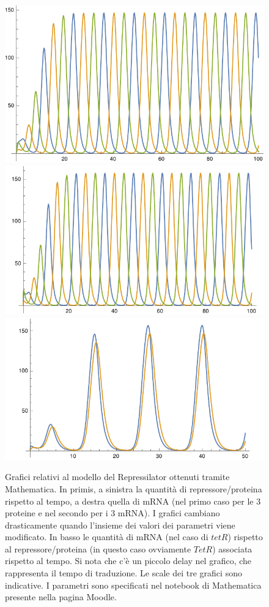 \documentclass[a4paper,12pt, oneside]{book}
\begin{document}
\begin{figure}[H]
  \centering
  \includegraphics[scale = 0.55]{img/reprprot.pdf}
  \includegraphics[scale = 0.55]{img/reprmrna.pdf}
  \includegraphics[scale = 0.55]{img/reprmix.pdf}
  \caption{Grafici relativi al modello del Repressilator ottenuti tramite
    Mathematica. In primis, a sinistra la quantità di 
    repressore/proteina rispetto al tempo, a destra quella di mRNA (nel primo
    caso per le 3 proteine e nel secondo per i 3 mRNA). I grafici
    cambiano drasticamente quando l'insieme dei valori dei parametri viene
    modificato. In basso le quantità di mRNA (nel caso di $tetR$) rispetto al
    repressore/proteina (in questo caso ovviamente $TetR$) associata rispetto al
    tempo. Si nota che c'è un piccolo delay nel grafico, che rappresenta il
    tempo di traduzione. Le scale dei tre grafici sono indicative. I parametri
    sono specificati nel notebook di Mathematica presente nella pagina Moodle.}   
\end{figure}
\end{document}

